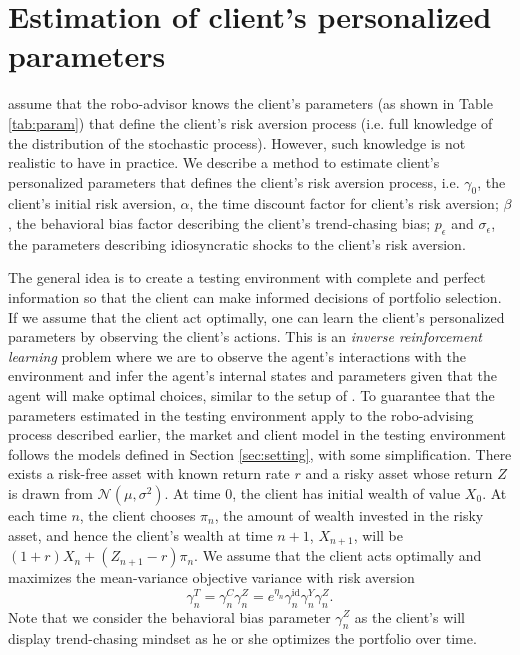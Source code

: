 \section{Estimation of client's personalized parameters}\label{sec:est}
 assume that the robo-advisor knows the client's parameters (as shown in Table \ref{tab:param}) that define the client's risk aversion process (i.e. full knowledge of the distribution of the stochastic process). However, such knowledge is not realistic to have in practice. We describe a method to estimate client's personalized parameters that defines the client's risk aversion process, i.e. $\gamma_0$, the client's initial risk aversion, $\alpha$, the time discount factor for client's risk aversion; $\beta$, the behavioral bias factor describing the client's trend-chasing bias; $p_{\epsilon}$ and $\sigma_{\epsilon}$, the parameters describing idiosyncratic shocks to the client’s risk aversion.

The general idea is to create a testing environment with complete and perfect information so that the client can make informed decisions of portfolio selection. If we assume that the client act optimally, one can learn the client's personalized parameters by observing the client's actions. This is an \textit{inverse reinforcement learning} problem \cite{ng2000algorithms} where we are to observe the agent's interactions with the environment and infer the agent's internal states and parameters given that the agent will make optimal choices, similar to the setup of . To guarantee that the parameters estimated in the testing environment apply to the robo-advising process described earlier, the market and client model in the testing environment follows the models defined in Section \ref{sec:setting}, with some simplification. There exists a risk-free asset with known return rate $r$ and a risky asset whose return $Z$ is drawn from $\mathcal{N}(\mu, \sigma^2)$. At time $0$, the client has initial wealth of value $X_0$. At each time $n$, the client chooses $\pi_n$, the amount of wealth invested in the risky asset, and hence the client's wealth at time $n+1$, $X_{n+1}$, will be $(1+r)X_{n}+(Z_{n+1}-r)\pi_n$. We assume that the client acts optimally and maximizes the mean-variance objective variance with risk aversion $$\gamma_n^T=\gamma_n^C\gamma_n^Z=e^{\eta_n}\gamma_n^{\text{id}}\gamma_n^Y\gamma_n^Z.$$ Note that we consider the behavioral bias parameter $\gamma_n^Z$ as the client's will display trend-chasing mindset as he or she optimizes the portfolio over time.

